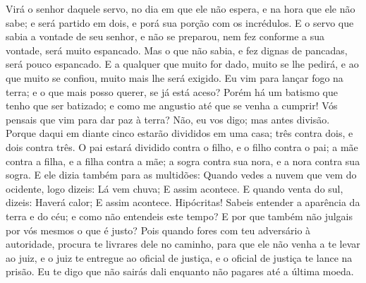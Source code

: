 {  Virá o senhor daquele servo, no dia em que ele não espera, e na hora que ele não sabe; e será partido em dois, e porá sua porção com os incrédulos.
  E o servo que sabia a vontade de seu senhor, e não se preparou, nem fez conforme a sua vontade, será muito espancado.
  Mas o que não sabia, e fez
{} dignas de pancadas, será pouco espancado. E a qualquer que muito for dado, muito se lhe pedirá, e ao que muito se confiou, muito mais lhe será exigido.
  Eu vim para lançar fogo na terra; e o que mais posso querer, se já está aceso?
  Porém há um batismo que tenho que ser batizado; e como me angustio até que se venha a cumprir!
  Vós pensais que vim para dar paz à terra? Não, eu vos digo; mas antes
{} divisão.
  Porque daqui em diante cinco estarão divididos em uma casa; três contra dois, e dois contra três.
  O pai estará dividido contra o filho, e o filho contra o pai; a mãe contra a filha, e a filha contra a mãe; a sogra contra sua nora, e a nora contra sua sogra.
  E ele dizia também para as multidões: Quando vedes a nuvem que vem do ocidente, logo dizeis: Lá vem chuva; E assim acontece.
  E quando venta do sul, dizeis: Haverá calor; E assim acontece.
  Hipócritas! Sabeis entender a aparência da terra e do céu; e como não entendeis este tempo?
  E por que também não julgais por vós mesmos o que é justo?
  Pois quando fores com teu adversário à autoridade, procura te livrares dele no caminho, para que ele não venha a te levar ao juiz, e o juiz te entregue ao oficial de justiça, e o oficial de justiça te lance na prisão.
  Eu te digo que não sairás dali enquanto não pagares até a última moeda.
\par }

